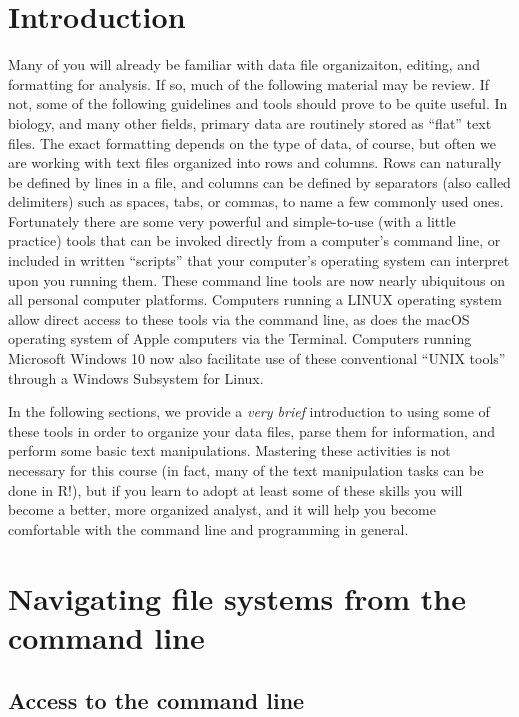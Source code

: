 \documentclass[]{book}
\begin{document}
\hypertarget{introduction}{%
\section{Introduction}\label{introduction}}

Many of you will already be familiar with data file organizaiton, editing, and formatting for analysis. If so, much of the following material may be review. If not, some of the following guidelines and tools should prove to be quite useful. In biology, and many other fields, primary data are routinely stored as ``flat'' text files. The exact formatting depends on the type of data, of course, but often we are working with text files organized into rows and columns. Rows can naturally be defined by lines in a file, and columns can be defined by separators (also called delimiters) such as spaces, tabs, or commas, to name a few commonly used ones. Fortunately there are some very powerful and simple-to-use (with a little practice) tools that can be invoked directly from a computer's command line, or included in written ``scripts'' that your computer's operating system can interpret upon you running them. These command line tools are now nearly ubiquitous on all personal computer platforms. Computers running a LINUX operating system allow direct access to these tools via the command line, as does the macOS operating system of Apple computers via the Terminal. Computers running Microsoft Windows 10 now also facilitate use of these conventional ``UNIX tools'' through a Windows Subsystem for Linux.

In the following sections, we provide a \emph{very brief} introduction to using some of these tools in order to organize your data files, parse them for information, and perform some basic text manipulations. Mastering these activities is not necessary for this course (in fact, many of the text manipulation tasks can be done in R!), but if you learn to adopt at least some of these skills you will become a better, more organized analyst, and it will help you become comfortable with the command line and programming in general.

\hypertarget{navigating-file-systems-from-the-command-line}{%
\section{Navigating file systems from the command line}\label{navigating-file-systems-from-the-command-line}}

\hypertarget{access-to-the-command-line}{%
\subsection{Access to the command line}\label{access-to-the-command-line}}
\end{document}
